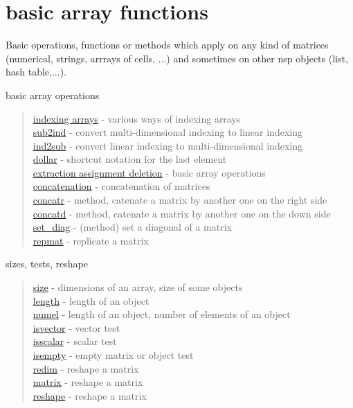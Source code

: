 \chapter*{basic array functions}

\hypertarget{arrays}{}

Basic operations, functions or methods which apply on any kind of matrices 
(numerical, strings, arrrays of cells, ...) and sometimes on other 
nsp objects (list, hash table,...).

basic array operations

\begin{quote}
\noindent
\hyperlink{indexing arrays}{indexing arrays} - various ways of indexing arrays \\
\hyperlink{sub2ind}{sub2ind} - convert multi-dimensional indexing to linear indexing \\
\hyperlink{ind2sub}{ind2sub} - convert linear indexing to multi-dimensional indexing \\
\hyperlink{dollar}{dollar} - shortcut notation for the last element\\
\hyperlink{extraction assignment deletion}{extraction assignment deletion} - basic array operations\\
\hyperlink{concatenation}{concatenation} - concatenation of matrices\\
\hyperlink{concatr}{concatr} - method, catenate a matrix by another one on the right side\\   
\hyperlink{concatd}{concatd} - method, catenate a matrix by another one on the down side\\   
\hyperlink{set_diag}{set\_diag} - (method) set a diagonal of a matrix \\
\hyperlink{repmat}{repmat} - replicate a matrix\\
\end{quote}


sizes, tests, reshape 

\begin{quote}
\noindent
\hyperlink{size}{size} - dimensions of an array, size of some objects \\
\hyperlink{length}{length} - length of an object  \\
\hyperlink{numel}{numel} - length of an object, number of elements of an object  \\
\hyperlink{isvector}{isvector} - vector test\\
\hyperlink{isscalar}{isscalar} - scalar test\\
\hyperlink{isempty}{isempty} - empty matrix or object test\\
\hyperlink{redim}{redim} - reshape a matrix\\
\hyperlink{matrix}{matrix} - reshape a matrix\\
\hyperlink{reshape}{reshape} - reshape a matrix\\
\end{quote}


